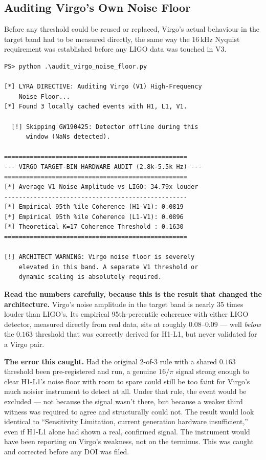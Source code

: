 \documentclass[11pt, letterpaper, openany]{book}
\begin{document}
\subsection*{Auditing Virgo's Own Noise Floor}

Before any threshold could be reused or replaced, Virgo's actual behaviour
in the target band had to be measured directly, the same way the 16\,kHz
Nyquist requirement was established before any LIGO data was touched in
V3.

\begin{lstlisting}[style=terminal]
PS> python .\audit_virgo_noise_floor.py

[*] LYRA DIRECTIVE: Auditing Virgo (V1) High-Frequency
    Noise Floor...
[*] Found 3 locally cached events with H1, L1, V1.

  [!] Skipping GW190425: Detector offline during this
      window (NaNs detected).

==================================================
--- VIRGO TARGET-BIN HARDWARE AUDIT (2.8k-5.5k Hz) ---
==================================================
[*] Average V1 Noise Amplitude vs LIGO: 34.79x louder
--------------------------------------------------
[*] Empirical 95th %ile Coherence (H1-V1): 0.0819
[*] Empirical 95th %ile Coherence (L1-V1): 0.0896
[*] Theoretical K=17 Coherence Threshold : 0.1630
==================================================

[!] ARCHITECT WARNING: Virgo noise floor is severely
    elevated in this band. A separate V1 threshold or
    dynamic scaling is absolutely required.
\end{lstlisting}

\textbf{Read the numbers carefully, because this is the result that
changed the architecture.} Virgo's noise amplitude in the target band is
nearly 35 times louder than LIGO's. Its empirical 95th-percentile
coherence with either LIGO detector, measured directly from real data,
sits at roughly $0.08$--$0.09$ --- well \emph{below} the $0.163$
threshold that was correctly derived for H1-L1, but never validated for
a Virgo pair.

\begin{warningbox}
\textbf{The error this caught.} Had the original 2-of-3 rule with a
shared $0.163$ threshold been pre-registered and run, a genuine $16/\pi$
signal strong enough to clear H1-L1's noise floor with room to spare
could still be too faint for Virgo's much noisier instrument to detect
at all. Under that rule, the event would be excluded --- not because the
signal wasn't there, but because a weaker third witness was required to
agree and structurally could not. The result would look identical to
``Sensitivity Limitation, current generation hardware insufficient,''
even if H1-L1 alone had shown a real, confirmed signal. The instrument
would have been reporting on Virgo's weakness, not on the terminus.
This was caught and corrected before any DOI was filed.
\end{warningbox}
\end{document}
